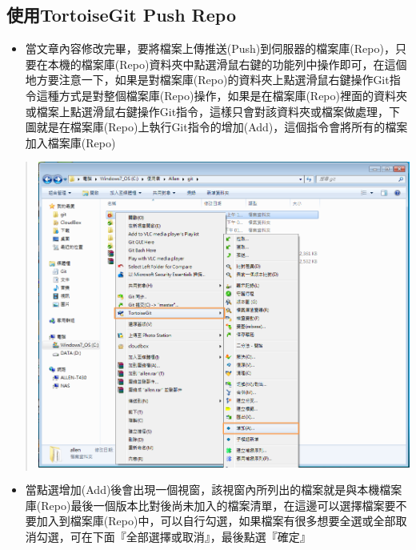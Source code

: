\documentclass[letterpaper,10pt,english]{sphinxmanual}
\begin{document}
\subsection{使用TortoiseGit Push Repo}
\label{_doc/writing/index:tortoisegit-push-repo}\begin{itemize}
\item {} 
當文章內容修改完畢，要將檔案上傳推送(Push)到伺服器的檔案庫(Repo)，只要在本機的檔案庫(Repo)資料夾中點選滑鼠右鍵的功能列中操作即可，在這個地方要注意一下，如果是對檔案庫(Repo)的資料夾上點選滑鼠右鍵操作Git指令這種方式是對整個檔案庫(Repo)操作，如果是在檔案庫(Repo)裡面的資料夾或檔案上點選滑鼠右鍵操作Git指令，這樣只會對該資料夾或檔案做處理，下圖就是在檔案庫(Repo)上執行Git指令的增加(Add)，這個指令會將所有的檔案加入檔案庫(Repo)

\end{itemize}
\begin{quote}

\includegraphics{tortoisegit-push-001.png}
\end{quote}
\begin{itemize}
\item {} 
當點選增加(Add)後會出現一個視窗，該視窗內所列出的檔案就是與本機檔案庫(Repo)最後一個版本比對後尚未加入的檔案清單，在這邊可以選擇檔案要不要加入到檔案庫(Repo)中，可以自行勾選，如果檔案有很多想要全選或全部取消勾選，可在下面『全部選擇或取消』，最後點選『確定』

\end{itemize}
\end{document}
